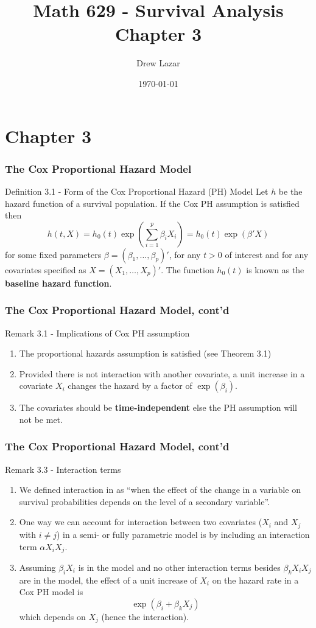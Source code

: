 \documentclass{beamer}
\title{Math 629 - Survival Analysis \\ Chapter 3}
\author{Drew Lazar}
\institute{Ball State University}
\date{\today}
\theoremstyle{definition}
\begin{document}
\begin{frame}
    \titlepage
\end{frame}



\section{Chapter 3}

\begin{frame}
\frametitle{The Cox Proportional Hazard Model}
\begin{block}{Definition 3.1 - Form of the Cox Proportional Hazard (PH) Model}
Let $h$ be the hazard function of a survival population. If the Cox PH assumption is satisfied then
\[
h(t,X) = h_0(t)\exp\left(\sum_{i=1}^p \beta_i X_i\right) = h_0(t)\exp(\beta' X)
\]
for some fixed parameters $\beta=(\beta_1,\ldots,\beta_p)'$, for any $t>0$ of interest and for any covariates specified as $X=(X_1,\ldots,X_p)'$. The function $h_0(t)$ is known as the \textbf{baseline hazard function}.
\end{block}
\end{frame}

\begin{frame}
\frametitle{The Cox Proportional Hazard Model, cont'd}
\begin{block}{Remark 3.1 - Implications of Cox PH assumption}
\begin{enumerate}
\item The proportional hazards assumption is satisfied (see Theorem 3.1)
\item Provided there is not interaction with another covariate, a unit increase in a covariate $X_i$ changes the hazard by a factor of $\exp(\beta_i)$.
\item The covariates should be \textbf{time-independent} else the PH assumption will not be met.
\end{enumerate}
\end{block}
\end{frame}

\begin{frame}
\frametitle{The Cox Proportional Hazard Model, cont'd}
\begin{block}{Remark 3.3 - Interaction terms}
\begin{enumerate}
\item We defined interaction in  as ``when the effect of the change in a variable on survival probabilities depends on the level of a secondary variable''.
\item One way we can account for interaction between two covariates ($X_i$ and $X_j$  with $i \neq j$) in a semi- or fully parametric model is by including an interaction term $\alpha X_iX_j$.
\item Assuming $\beta_i X_i$ is in the model and no other interaction terms besides $\beta_k X_i X_j$ are in the model, the effect of a unit increase of $X_i$ on the hazard rate in a Cox PH model is
\[
\exp(\beta_i + \beta_k X_j)
\]
which depends on $X_j$ (hence the interaction).
\end{enumerate}
\end{block}
\end{frame}
\end{document}
